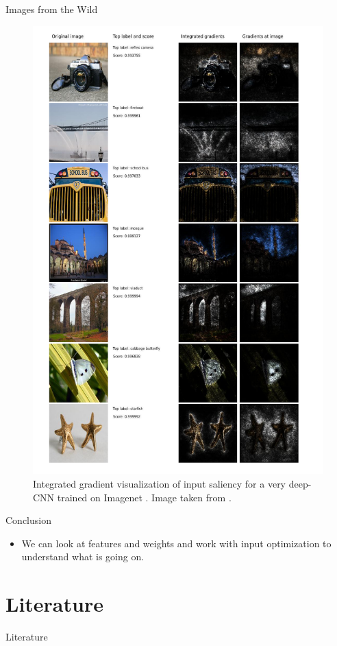 \documentclass{beamer}
\begin{document}
    \begin{frame}{Images from the Wild}
      \begin{figure}
      \includegraphics[scale=.16]{./figures/ig_paper.png}
      \caption{Integrated gradient visualization of input saliency for a very deep-CNN trained on Imagenet \cite{deng2009imagenet}.
      Image taken from \cite{sundararajan2017axiomatic}.}
      \end{figure}
    \end{frame}

    \begin{frame}{Conclusion}
      \begin{itemize}
        \item We can look at features and weights and work with input optimization to understand what is going on.
      \end{itemize}
    \end{frame}

    \section{Literature}
    \begin{frame}[allowframebreaks]{Literature}
      \printbibliography
    \end{frame}
\end{document}
